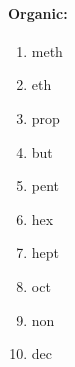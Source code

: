\documentclass[9pt]{article}
\begin{document}
\paragraph{\textsf{Organic:}}

\begin{multicols}{2}
	
	\begin{enumerate}
		\item meth
		\item eth
		\item prop
		\item but
		\item pent
		\item hex
		\item hept
		\item oct
		\item non
		\item dec
	\end{enumerate}
\end{multicols}
\end{document}
